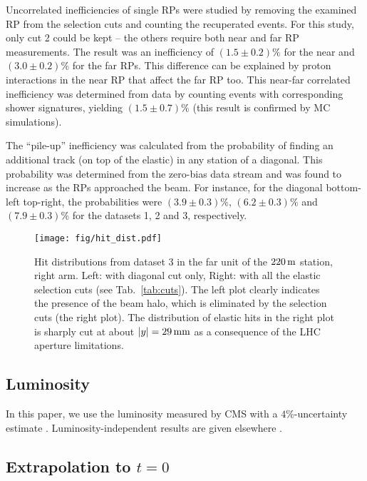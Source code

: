 \documentclass[doublecol]{../macros/epl2}
\def\un#1{\,{\rm #1}}
\begin{document}
Uncorrelated inefficiencies of single RPs were studied by removing the examined RP from the selection cuts and counting the recuperated events. For this study, only cut 2 could be kept -- the others require both near and far RP measurements. The result was an inefficiency of $(1.5 \pm 0.2)\%$ for the near and $(3.0 \pm 0.2)\%$ for the far RPs. This difference can be explained by proton interactions in the near RP that affect the far RP too. This near-far correlated inefficiency was determined from data by counting events with corresponding shower signatures, yielding $(1.5\pm 0.7)\%$ (this result is confirmed by MC simulations).

The ``pile-up'' inefficiency was calculated from the probability of finding an additional track (on top of the elastic) in any station of a diagonal. This probability was determined from the zero-bias data stream and was found to increase as the RPs approached the beam. For instance, for the diagonal bottom-left top-right, the probabilities were $(3.9 \pm 0.3)\%$, $(6.2 \pm 0.3)\%$ and $(7.9 \pm 0.3)\%$ for the datasets 1, 2 and 3, respectively.


\begin{figure*}
\hbox{}\vskip-7mm
\begin{center}
\texttt{[image: fig/hit\_dist.pdf]}
\vskip-5mm
\caption{Hit distributions from dataset 3 in the far unit of the $220\un{m}$ station, right arm. Left: with diagonal cut only, Right: with all the elastic selection cuts (see Tab.~\ref{tab:cuts}). The left plot clearly indicates the presence of the beam halo, which is eliminated by the selection cuts (the right plot). The distribution of elastic hits in the right plot is sharply cut at about $|y| = 29\un{mm}$ as a consequence of the LHC aperture limitations. }
\label{fig:hit dist}
\end{center}
\end{figure*}

\subsection{Luminosity}

In this paper, we use the luminosity measured by CMS with a $4\%$-uncertainty estimate%
. Luminosity-independent results are given elsewhere \cite{P3}.


\subsection{Extrapolation to $t=0$}
\end{document}
